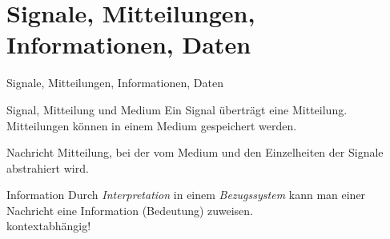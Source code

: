 %
%

\section{Signale, Mitteilungen, Informationen, Daten}

\morescalingdelimiters

\begin{frame}{Signale, Mitteilungen, Informationen, Daten}
	\begin{block}{Signal, Mitteilung und Medium}
		Ein Signal überträgt eine Mitteilung. Mitteilungen können in einem Medium gespeichert werden.
	\end{block}
	\pause
	\begin{block}{Nachricht}
		Mitteilung, bei der vom Medium und den Einzelheiten der Signale abstrahiert wird.
	\end{block}
	\pause
	\begin{block}{Information}
		Durch \textit{Interpretation} in einem \textit{Bezugssystem} kann man einer Nachricht eine Information (Bedeutung) zuweisen. \\
		\impl kontextabhängig!
	\end{block}

\end{frame}

